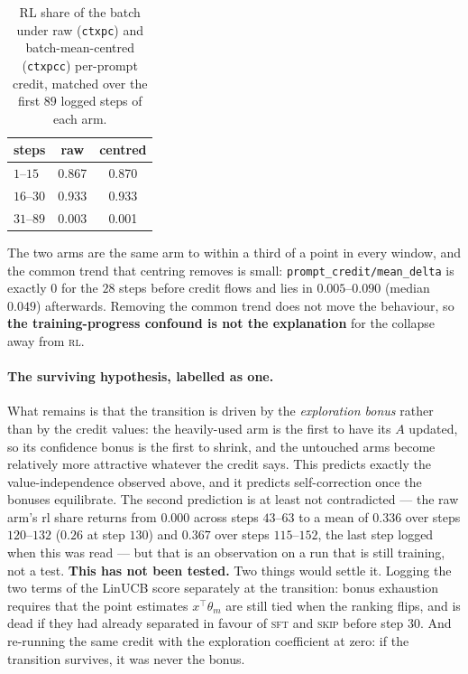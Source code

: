 \begin{table}[t]
\centering\small
\caption{RL share of the batch under raw (\texttt{ctxpc}) and batch-mean-centred
(\texttt{ctxpcc}) per-prompt credit, matched over the first $89$ logged steps of each arm.}
\label{tab:centring}
\begin{tabular}{lcc}
\toprule
steps & raw & centred \\
\midrule
$1$--$15$  & 0.867 & 0.870 \\
$16$--$30$ & 0.933 & 0.933 \\
$31$--$89$ & 0.003 & 0.001 \\
\bottomrule
\end{tabular}
\end{table}

The two arms are the same arm to within a third of a point in every window, and the common
trend that centring removes is small: \texttt{prompt\_credit/mean\_delta} is exactly $0$ for
the $28$ steps before credit flows and lies in $0.005$--$0.090$ (median $0.049$) afterwards.
Removing the common trend does not move the behaviour, so \textbf{the training-progress
confound is not the explanation} for the collapse away from \textsc{rl}.

\paragraph{The surviving hypothesis, labelled as one.} What remains is that the transition is
driven by the \emph{exploration bonus} rather than by the credit values: the heavily-used arm
is the first to have its $A$ updated, so its confidence bonus is the first to shrink, and the
untouched arms become relatively more attractive whatever the credit says. This predicts
exactly the value-independence observed above, and it predicts self-correction once the
bonuses equilibrate. The second prediction is at least not contradicted --- the raw arm's rl
share returns from $0.000$ across steps $43$--$63$ to a mean of $0.336$ over steps
$120$--$132$ ($0.26$ at step $130$) and $0.367$ over steps $115$--$152$, the last step logged
when this was read --- but that is an
observation on a run that is still training, not a test. \textbf{This has not been tested.}
Two things would settle it. Logging the two terms of the LinUCB score separately at the
transition: bonus exhaustion requires that the point estimates $x^\top\theta_m$ are still tied
when the ranking flips, and is dead if they had already separated in favour of \textsc{sft}
and \textsc{skip} before step $30$. And re-running the same credit with the exploration
coefficient at zero: if the transition survives, it was never the bonus.

